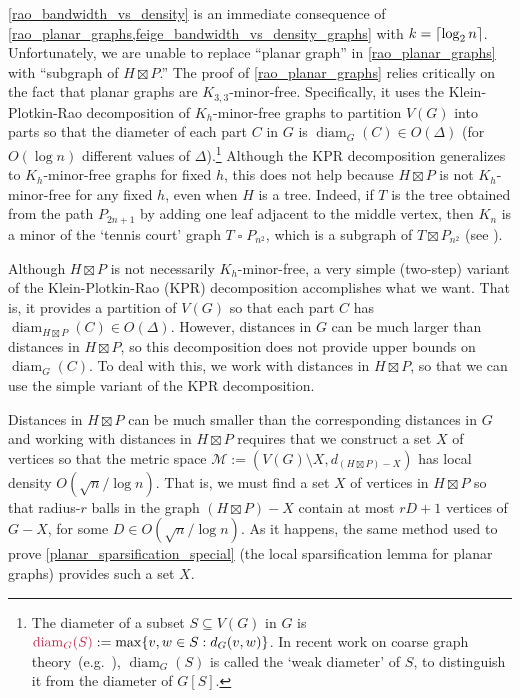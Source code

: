 \documentclass{patmorin}
\makeatletter
\def\mathcolor#1#{\@mathcolor{#1}}
\def\@mathcolor#1#2#3{%
  \protect\leavevmode
  \begingroup
    \color#1{#2}#3%
  \endgroup
}
\newcommand{\mathdefin}[1]{\mathcolor{brightmaroon}{#1}}
\DeclareMathOperator{\diam}{diam}
\makeatother
\begin{document}
\cref{rao_bandwidth_vs_density} is an immediate consequence of \cref{rao_planar_graphs,feige_bandwidth_vs_density_graphs} with $k={\lceil \log_2 n \rceil}$.  Unfortunately, we are unable to replace ``planar graph'' in \cref{rao_planar_graphs} with ``subgraph of $H\boxtimes P$.''  The proof of \cref{rao_planar_graphs} relies critically on the fact that planar graphs are $K_{3,3}$-minor-free.  Specifically, it uses the Klein-Plotkin-Rao decomposition \cite{klein.plotkin.ea:excluded} of $K_{h}$-minor-free graphs to partition $V(G)$ into parts so that the diameter of each part $C$ in $G$ is $\diam_G(C)\in O(\Delta)$ (for $O(\log n)$ different values of $\Delta$).\footnote{The diameter of a subset $S\subseteq V(G)$ in $G$ is $\mathdefin{\diam_{G}(S)}:=\max\{v,w\in S:d_G(v,w)\}$. In recent work on coarse graph theory~(e.g.~\citep{DN23,BBEGLPS}), $\diam_G(S)$ is called the `weak diameter' of $S$, to distinguish it from the diameter of $G[S]$.}  Although the KPR decomposition generalizes to $K_h$-minor-free graphs for fixed $h$, this does not help because $H\boxtimes P$ is not $K_h$-minor-free for any fixed $h$, even when $H$ is a tree.  Indeed, if $T$ is the tree obtained from the path $P_{2n+1}$ by adding one leaf adjacent to the middle vertex, then $K_n$ is a minor of the `tennis court' graph $T\mathbin{\square} P_{n^2}$, which is a subgraph of $T\boxtimes P_{n^2}$ (see  \citep{Wood-NYJM11}).


Although $H\boxtimes P$ is not necessarily $K_h$-minor-free, a very simple (two-step) variant of the Klein-Plotkin-Rao (KPR) decomposition accomplishes what we want.  That is, it provides a partition of $V(G)$ so that each part $C$ has $\diam_{H\boxtimes P}(C)\in O(\Delta)$. However, distances in $G$ can be much larger than distances in $H\boxtimes P$, so this decomposition does not provide upper bounds on $\diam_G(C)$.  To deal with this, we work with distances in $H\boxtimes P$, so that we can use the simple variant of the KPR decomposition.

Distances in $H\boxtimes P$ can be much smaller than the corresponding distances in $G$ and working with distances in $H\boxtimes P$ requires that we construct a set $X$ of vertices so that the metric space $\mathcal{M}:=(V(G)\setminus X,d_{(H\boxtimes P)-X})$ has local density $O(\sqrt{n}/\log n)$.  That is, we must find a set $X$  of vertices in $H\boxtimes P$ so that radius-$r$ balls in the graph $(H\boxtimes P)-X$ contain at most $rD+1$ vertices of $G-X$, for some $D\in O(\sqrt{n}/\log n)$.  As it happens, the same method used to prove \cref{planar_sparsification_special} (the local sparsification lemma for planar graphs) provides such a set $X$.
\end{document}
